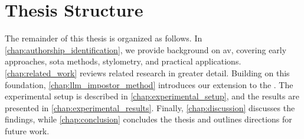 \section{Thesis Structure}
\label{sec:thesis_structure}
The remainder of this thesis is organized as follows. 
In \autoref{chap:authorship_identification}, we provide background on \acf{av}, covering early approaches, \acl{sota} methods, stylometry, and practical applications. 
\autoref{chap:related_work} reviews related research in greater detail. 
Building on this foundation, \autoref{chap:llm_impostor_method} introduces our extension to the \impAppr{}. 
The experimental setup is described in \autoref{chap:experimental_setup}, and the results are presented in \autoref{chap:experimental_results}. 
Finally, \autoref{chap:discussion} discusses the findings, while \autoref{chap:conclusion} concludes the thesis and outlines directions for future work.
